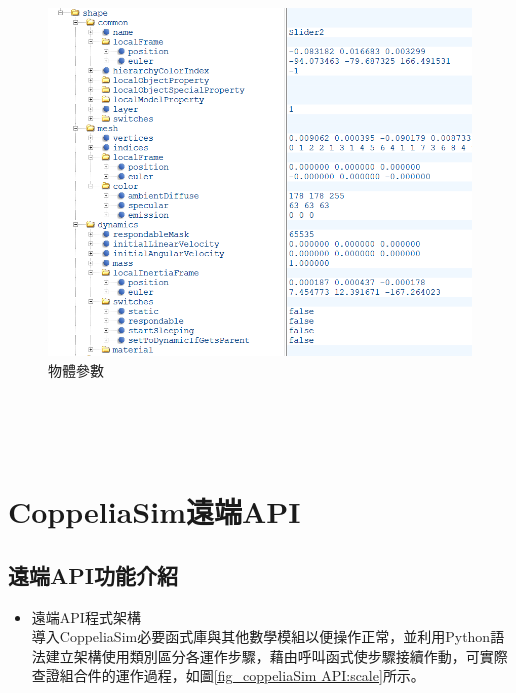 \documentclass[14pt,a4paper]{report}  %
\newcommand{\fourteen}{\fontsize{14pt}{\baselineskip}\selectfont}%
\begin{document}
{{{{      \begin{figure}[hbt!]
        \centering
        \includegraphics[scale=0.6]{xml_tree_structure_shape.PNG} 
        \caption{物體參數}
        \label{fig_xml_tree_structure_shape:scale}
      \end{figure}
      
	\hspace*{\fill} \\
	\hspace*{\fill} \\
	\hspace*{\fill} \\
      \section{CoppeliaSim遠端API}
      \subsection{遠端API功能介紹}
      \fourteen {利用組合件放入CoppeliaSim中進行從屬關係的架設與半自動設定物理條件，藉由API(Application Programming Interface)連接CoppeliaSim遠端操控馬達使組合件作動，以查證組合件之機構在運作時的實際狀況。}
    
      \begin{itemize}
     \item 遠端API程式架構
     \hspace*{\fill} \\
     導入CoppeliaSim必要函式庫與其他數學模組以便操作正常，並利用Python語法建立架構使用類別區分各運作步驟，藉由呼叫函式使步驟接續作動，可實際查證組合件的運作過程，如圖\ref{fig_coppeliaSim API:scale}所示。
     \end{itemize}
     
}}}}
\end{document}
